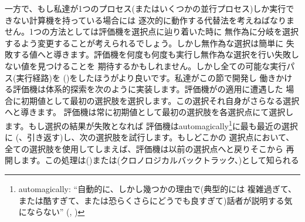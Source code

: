 一方で、もし私達が1つのプロセス(またはいくつかの並行プロセス)しか実行できない計算機を持っている場合には
逐次的に動作する代替法を考えねばなりません。1つの方法としては評価機を選択点に辿り着いた時に
無作為に分岐を選択するよう変更することが考えられるでしょう。しかし無作為な選択は簡単に
失敗する値へと導きます。評価機を何度も何度も実行し無作為な選択を行い失敗しない値を見つけることを
期待するかもしれません。しかし全ての可能な実行パス(実行経路)を
()をしたほうがより良いです。私達がこの節で開発し
働きかける評価機は体系的探索を次のように実装します。評価機がの適用に遭遇した
場合に初期値として最初の選択肢を選択します。この選択それ自身がさらなる選択へと導きます。
評価機は常に初期値として最初の選択肢を各選択点にて選択します。もし選択の結果が失敗となれば
評価機はautomagically\footnote{automagically: ``自動的に、しかし幾つかの理由で(典型的には
複雑過ぎて、または酷すぎて、または恐らくさらにどうでも良すぎて)話者が説明する気にならない''
(, )\label{Footnote 4.47}}に最も最近の選択に
(、引き返す)し、次の選択肢を試行します。もしどこかの
選択点において、全ての選択肢を使用してしまえば、評価機は以前の選択点へと戻りそこから
再開します。この処理は()または(クロノロジカルバックトラック、)として知られる
